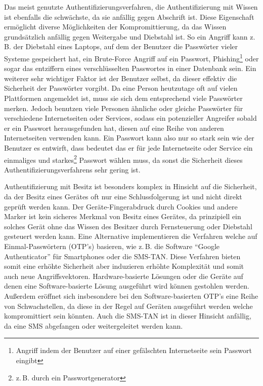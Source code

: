 \documentclass[11pt,a4paper,ngerman]{scrreprt}
\begin{document}
\begin{description}[font=\rmfamily]
    \item[Wissen:] Das meist genutzte Authentifizierungsverfahren, die Authentifizierung mit Wissen ist ebenfalls die schwächste, da sie anfällig gegen Abschrift ist. Diese Eigenschaft ermöglicht diverse Möglichkeiten der Kompromittierung, da das Wissen grundsätzlich anfällig gegen Weitergabe und Diebstahl ist. So ein Angriff kann z.\,B. der Diebstahl eines Laptops, auf dem der Benutzer die Passwörter vieler Systeme gespeichert hat, ein Brute-Force Angriff auf ein Passwort, Phishing\footnote{Angriff indem der Benutzer auf einer gefälschten Internetseite sein Passwort eingibt} oder sogar das entziffern eines verschlüsselten Passwortes in einer Datenbank sein. Ein weiterer sehr wichtiger Faktor ist der Benutzer selbst, da dieser effektiv die Sicherheit der Passwörter vorgibt. Da eine Person heutzutage oft auf vielen Plattformen angemeldet ist, muss sie sich dem entsprechend viele Passwörter merken. Jedoch benutzen viele Personen ähnliche oder gleiche Passwörter für verschiedene Internetseiten oder Services, sodass ein potenzieller Angreifer sobald er ein Passwort herausgefunden hat, diesen auf eine Reihe von anderen Internetseiten verwenden kann. Ein Passwort kann also nur so stark sein wie der Benutzer es entwirft, dass bedeutet das er für jede Internetseite oder Service ein einmaliges und starkes\footnote{z.\,B. durch ein Passwortgenerator} Passwort wählen muss, da sonst die Sicherheit dieses Authentifizierungsverfahrens sehr gering ist.
    \item[Besitz:] Authentifizierung mit Besitz ist besonders komplex in Hinsicht auf die Sicherheit, da der Besitz eines Gerätes oft nur eine Schlussfolgerung ist und nicht direkt geprüft werden kann. Der Geräte-Fingerabdruck durch Cookies und andere Marker ist kein sicheres Merkmal von Besitz eines Gerätes, da prinzipiell ein solches Gerät ohne das Wissen des Besitzer durch Fernsteuerung oder Diebstahl gesteuert werden kann. Eine Alternative implementieren die Verfahren welche auf Einmal-Passwörtern (OTP's) basieren, wie z.\,B. die Software ``Google Authenticator'' für Smartphones oder die SMS-TAN. Diese Verfahren bieten somit eine erhöhte Sicherheit aber induzieren erhöhte Komplexität und somit auch neue Angriffsvektoren. Hardware-basierte Lösungen oder die Geräte auf denen eine Software-basierte Lösung ausgeführt wird können gestohlen werden. Außerdem eröffnet sich insbesondere bei den Software-basierten OTP's eine Reihe von Schwachstellen, da diese in der Regel auf Geräten ausgeführt werden welche kompromittiert sein könnten. Auch die SMS-TAN ist in dieser Hinsicht anfällig, da eine SMS abgefangen oder weitergeleitet werden kann.

\end{description}
\end{document}
